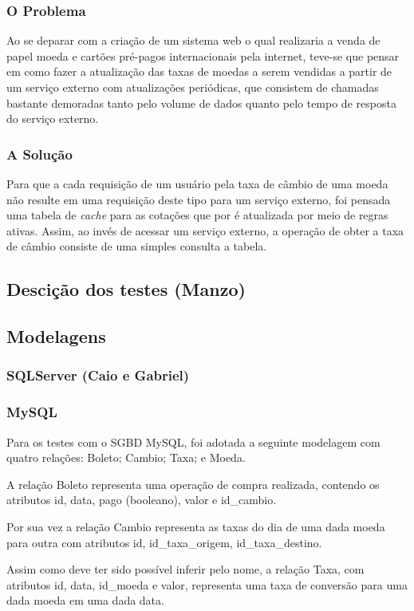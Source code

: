 \documentclass[conference]{IEEEtran}
\begin{document}
    \subsubsection{O Problema}
    Ao se deparar com a criação de um sistema web o qual realizaria a venda de papel moeda e cartões pré-pagos internacionais pela internet, teve-se que pensar em como fazer a atualização das taxas de moedas a serem vendidas a partir de um serviço externo com atualizações periódicas, que consistem de chamadas bastante demoradas tanto pelo volume de dados quanto pelo tempo de resposta do serviço externo.

    \subsubsection{A Solução}
    Para que a cada requisição de um usuário pela taxa de câmbio de uma moeda não resulte em uma requisição deste tipo para um serviço externo, foi pensada uma tabela de \textit{cache} para as cotações que por é atualizada por meio de regras ativas. Assim, ao invés de acessar um serviço externo, a operação de obter a taxa de câmbio consiste de uma simples consulta a tabela.

  \subsection{Descição dos testes (Manzo)}

  \subsection{Modelagens}
    \subsubsection{SQLServer (Caio e Gabriel)}
    \subsubsection{MySQL}
    Para os testes com o SGBD MySQL, foi adotada a seguinte modelagem com quatro relações: Boleto; Cambio; Taxa; e Moeda.

    A relação Boleto representa uma operação de compra realizada, contendo os atributos id, data, pago (booleano), valor e id_cambio.

    Por sua vez a relação Cambio representa as taxas do dia de uma dada moeda para outra com atributos id, id_taxa_origem, id_taxa_destino.

    Assim como deve ter sido possível inferir pelo nome, a relação Taxa, com atributos id, data, id_moeda e valor, representa uma taxa de conversão para uma dada moeda em uma dada data.
\end{document}
